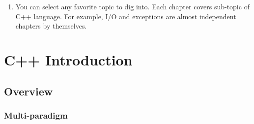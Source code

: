 \documentclass[a4paper,11pt,twoside]{book}
\begin{document}
\begin{itemize}
\begin{enumerate}
        \item You can select any favorite topic to dig into. Each chapter covers sub-topic of C++ language. For example, I/O and exceptions are almost independent chapters by themselves.
	\end{enumerate}

\end{itemize}

\chapter{C++ Introduction}

\section{Overview}
\subsection{Multi-paradigm}
\end{document}
